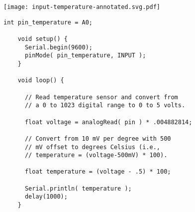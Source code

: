 \vspace{0.1in}
\begin{minipage}[t]{0.49\tw}
  \vspace{0.6in}

  \texttt{[image: input-temperature-annotated.svg.pdf]}
\end{minipage}
\hfill
\begin{minipage}[t]{0.49\tw}
  \vspace{0.1in}
  \begin{Verbatim}[gobble=3,fontsize=\small]
    int pin_temperature = A0;

    void setup() {
      Serial.begin(9600);
      pinMode( pin_temperature, INPUT );
    }

    void loop() {

      // Read temperature sensor and convert from
      // a 0 to 1023 digital range to 0 to 5 volts.

      float voltage = analogRead( pin ) * .004882814;

      // Convert from 10 mV per degree with 500
      // mV offset to degrees Celsius (i.e.,
      // temperature = (voltage-500mV) * 100).

      float temperature = (voltage - .5) * 100;

      Serial.println( temperature );
      delay(1000);
    }
  \end{Verbatim}
\end{minipage}
\vspace{0.1in}

